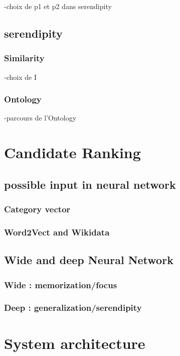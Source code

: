 \documentclass[11pt]{article}
\theoremstyle{plain}
\theoremstyle{definition}
\theoremstyle{remark}
\begin{document}
-choix de p1 et p2 dans serendipity

\newpage
\subsection{serendipity}

\subsubsection{Similarity}

-choix de I

\subsubsection{Ontology}

-parcours de l'Ontology

\section{Candidate Ranking}

\subsection{possible input in neural network}
\subsubsection{Category vector}
\subsubsection{Word2Vect and Wikidata}

\subsection{Wide and deep Neural Network}
\subsubsection{Wide : memorization/focus}
\subsubsection{Deep : generalization/serendipity}


\newpage

\section{System architecture}
\end{document}
